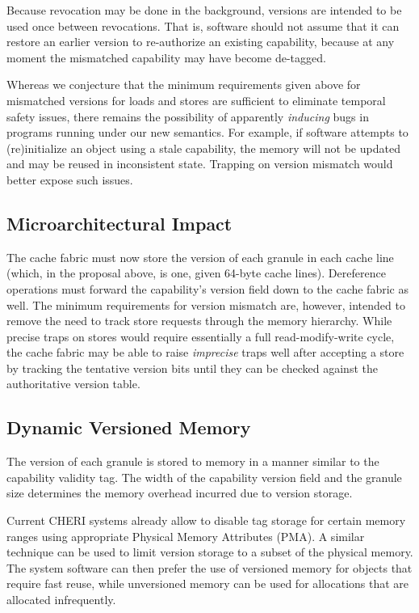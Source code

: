 Because revocation may be done in the background, versions are intended to
be used once between revocations. That is, software should not assume that
it can restore an earlier version to re-authorize an existing capability,
because at any moment the mismatched capability may have become de-tagged.

Whereas we conjecture that the minimum requirements given above for mismatched
versions for loads and stores are sufficient to eliminate temporal safety
issues, there remains the possibility of apparently \emph{inducing} bugs in
programs running under our new semantics.  For example, if software attempts
to (re)initialize an object using a stale capability, the memory will not be
updated and may be reused in inconsistent state.  Trapping on version
mismatch would better expose such issues.

\subsection{Microarchitectural Impact} %

The cache fabric must now store the version of each granule in each cache line
(which, in the proposal above, is one, given 64-byte cache lines).
Dereference operations must forward the capability's version field down to
the cache fabric as well.  The minimum requirements for version mismatch
are, however, intended to remove the need to track store requests through
the memory hierarchy.  While precise traps on stores would require
essentially a full read-modify-write cycle, the cache fabric may be able to
raise \emph{imprecise} traps well after accepting a store by tracking the
tentative version bits until they can be checked against the authoritative version
table.

\subsection{Dynamic Versioned Memory}

The version of each granule is stored to memory in a manner similar to the capability
validity tag. The width of the capability version field and the granule size
determines the memory overhead incurred due to version storage.

Current CHERI systems already allow to disable tag storage for certain memory
ranges using appropriate Physical Memory Attributes (PMA).
A similar technique can be used to limit version storage to a subset of the physical
memory. The system software can then prefer the use of versioned memory for objects
that require fast reuse, while unversioned memory can be used for allocations that
are allocated infrequently.


